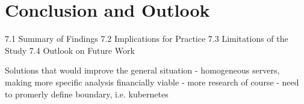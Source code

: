 \chapter{Conclusion and Outlook} %
\label{Chapter7}

    7.1 Summary of Findings
    7.2 Implications for Practice
    7.3 Limitations of the Study
    7.4 Outlook on Future Work


Solutions that would improve the general situation
- homogeneous servers, making more specific analysis financially viable
- more research of course
- need to promerly define boundary, i.e. kubernetes